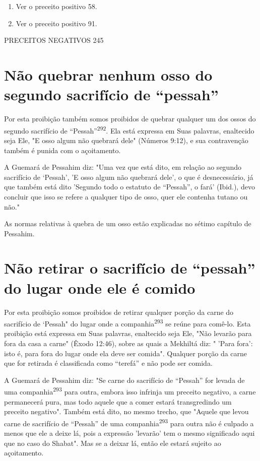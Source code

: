 \begin{enumerate}
\def\labelenumi{\arabic{enumi}.}
\setcounter{enumi}{289}
\item
 
 Ver o preceito positivo 58.
 
\item
 
 Ver o preceito positivo 91.
 
\end{enumerate}


PRECEITOS NEGATIVOS 245

\section{Não quebrar nenhum osso do segundo sacrifício de ``pessah''}

Por esta proibição também somos proibidos de quebrar qualquer um dos
ossos do segundo sacrifício de ``Pessah''\textsuperscript{292}. Ela está
expressa em Suas pa­lavras, enaltecido seja Ele, "E osso algum não
quebrará dele" (Números 9:12), e sua contravenção também é punida com o
açoitamento.

A Guemará de Pessahim diz: "Uma vez que está dito, em relação ao segundo
sacrifício de `Pessah', 'E osso algum não quebrará dele', o que é
des­necessário, já que também está dito 'Segundo todo o estatuto de
``Pessah'', o fará' (Ibid.), devo concluir que isso se refere a qualquer
tipo de osso, quer ele contenha tutano ou não."

As normas relativas à quebra de um osso estão explicadas no sétimo
capítulo de Pessahim.

\section{Não retirar o sacrifício de ``pessah'' do lugar onde ele é comido}

Por esta proibição somos proibidos de retirar qualquer porção da car­ne
do sacrifício de `Pessah" do lugar onde a companhia\textsuperscript{293}
se reúne para comê-lo. Esta proibição está expressa em Suas palavras,
enaltecido seja Ele, "Não leva­rão para fora da casa a carne" (Êxodo
12:46), sobre as quais a Mekhiltá diz: " 'Pa­ra fora': isto é, para fora
do lugar onde ela deve ser comida". Qualquer porção da carne que for
retirada é classificada como ``terefá'' e não pode ser comida.

A Guemará de Pessahim diz: "Se carne do sacrifício de ``Pessah'' for
levada de uma companhia\textsuperscript{293} para outra, embora isso
infrinja um preceito ne­gativo, a carne permanecerá pura, mas todo
aquele que a comer estará trans­gredindo um preceito negativo". Também
está dito, no mesmo trecho, que "Aquele que levou carne de sacrifício de
``Pessah'' de uma companhia\textsuperscript{293} para outra não é culpado
a menos que ele a deixe lá, pois a expressão 'levarão' tem o mesmo
significado aqui que no caso do Shabat". Mas se a deixar lá, então ele
estará sujeito ao açoitamento.


